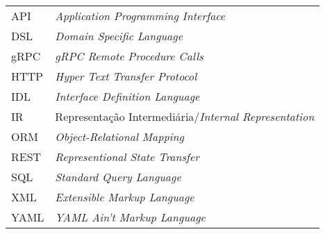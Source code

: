 \begin{longtable}{ll}
  API & \textit{Application Programming Interface} \\
  DSL & \textit{Domain Specific Language} \\
  gRPC & \textit{gRPC Remote Procedure Calls} \\
  HTTP & \textit{Hyper Text Transfer Protocol} \\
  IDL & \textit{Interface Definition Language} \\
  IR & Representação Intermediária/\textit{Internal Representation} \\
  ORM & \textit{Object-Relational Mapping} \\
  REST & \textit{Representional State Transfer} \\
  SQL & \textit{Standard Query Language} \\
  XML & \textit{Extensible Markup Language} \\
  YAML & \textit{YAML Ain't Markup Language} \\
\end{longtable}

